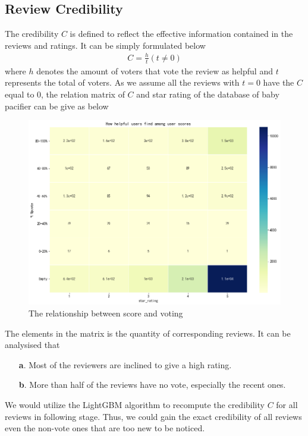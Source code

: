 \documentclass[12pt]{article}%
\begin{document}
\subsection{Review Credibility}
The credibility $C$ is defined to reflect the effective information contained in the reviews and ratings. It can be simply formulated below 
\begin{gather}
C=\frac{h}{t} (t\neq 0)
\end{gather}
where $h$ denotes the amount of voters that vote the review as helpful and $t$ represents the total of voters. As we assume all the reviews with $t=0$ have the $C$ equal to $0$, the relation matrix of $C$ and star rating of the database of baby pacifier can be give as below 
\begin{figure}[H]
\centering
\includegraphics[width=\textwidth]{Upvote.png}%

\caption{The relationship between score and voting}\label{llssll}%
\end{figure}
The elements in the matrix is the quantity of corresponding reviews. It can be analysised that 
\begin{itemize} 
	\item  [\textbf{a}.] Most of the reviewers are inclined to give a high rating.
	\item  [\textbf{b}.] More than half of the reviews have no vote, especially the recent ones.
\end{itemize}
We would utilize the LightGBM algorithm to recompute the credibility $C$ for all reviews in following stage. Thus, we could gain the exact credibility of all reviews even the non-vote ones that are too new to be noticed.
\end{document}
